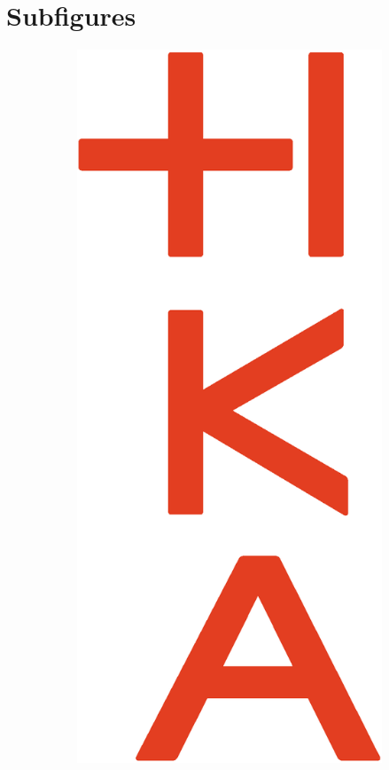 \section{Subfigures}
\begin{figure}[H]
    \centering
    \begin{subfigure}[b]{0.3\textwidth}
        \includegraphics[width=\textwidth]{logos/HKA_Bildmarke-v_CMYK}

\end{subfigure}
\end{figure}
